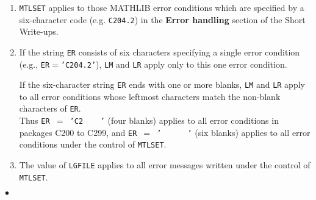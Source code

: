 \begin{enumerate}
\item {\tt MTLSET} applies to those MATHLIB error conditions
which are specified by a six-character code (e.g. {\tt C204.2}) in the
{\bf Error handling} section of the Short Write-ups.
\item If the string {\tt ER} consists of six characters specifying a
single error condition \\
(e.g., {\tt ER}$=${\tt 'C204.2'}), {\tt LM} and
{\tt LR} apply only to this one error condition.
\par
If the six-character string {\tt ER} ends with one or more blanks,
{\tt LM} and {\tt LR} apply to all error conditions whose leftmost
characters match the non-blank characters of {\tt ER}. \\
Thus {\tt ER $=$ 'C2\ \ \ \ '}  (four blanks) applies to all error
conditions in packages C200 to C299, and {\tt ER $=$ '\ \ \ \ \ \ '}
(six blanks) applies to all error conditions under the control of
{\tt MTLSET}.
\item The value of {\tt LGFILE} applies to all error messages written
under the control of {\tt MTLSET}.
\end{enumerate}
$\bullet$
